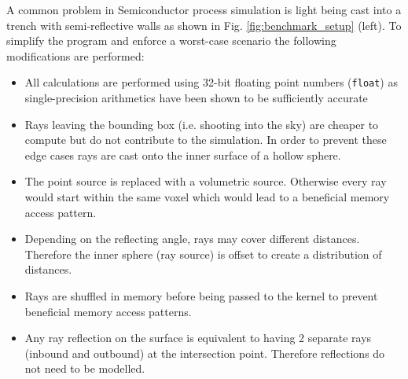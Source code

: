 A common problem in Semiconductor process simulation is light being cast into a trench with semi-reflective walls as shown in Fig. \ref{fig:benchmark_setup} (left).
To simplify the program and enforce a worst-case scenario the following modifications are performed:

\begin{itemize}
	\item All calculations are performed using 32-bit floating point numbers (\texttt{float}) as single-precision arithmetics have been shown to be sufficiently accurate \cite[Chapter 5.1]{manstetten2018efficient}
	\item Rays leaving the bounding box (i.e. shooting into the sky) are cheaper to compute but do not contribute to the simulation.
	      In order to prevent these edge cases rays are cast onto the inner surface of a hollow sphere.
	\item The point source is replaced with a volumetric source. Otherwise every ray would start within the same voxel which would lead to a beneficial memory access pattern.
	\item Depending on the reflecting angle, rays may cover different distances. Therefore the inner sphere (ray source) is offset to create a distribution of distances.
	\item Rays are shuffled in memory before being passed to the kernel to prevent beneficial memory access patterns.
	\item Any ray reflection on the surface is equivalent to having 2 separate rays (inbound and outbound) at the intersection point. Therefore reflections do not need to be modelled.
\end{itemize}


